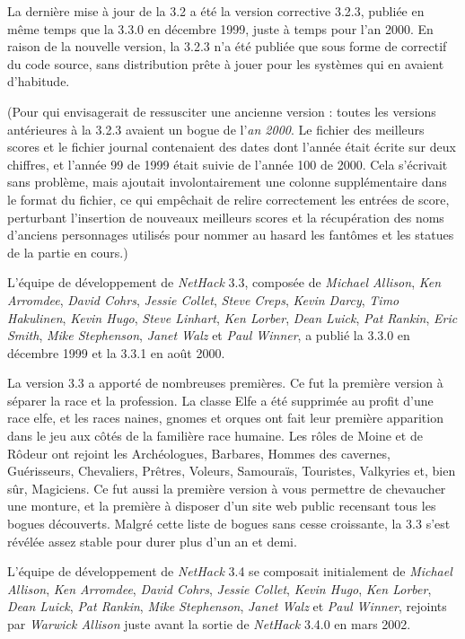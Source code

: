 \documentclass[titlepage]{article}
\begin{document}
\medskip
La dernière mise à jour de la 3.2 a été la version corrective 3.2.3, publiée
en même temps que la 3.3.0 en décembre 1999, juste à temps pour l'an 2000.
En raison de la nouvelle version, la 3.2.3 n'a été publiée que sous forme de correctif
du code source, sans distribution prête à jouer pour les systèmes qui en avaient d'habitude.

(Pour qui envisagerait de ressusciter une ancienne version : toutes les versions antérieures
à la 3.2.3 avaient un bogue de l'\textit{an 2000}.
Le fichier des meilleurs scores et le fichier journal contenaient
des dates dont l'année était écrite sur deux chiffres, et l'année 99 de 1999 était
suivie de l'année 100 de 2000.
Cela s'écrivait sans problème, mais
ajoutait involontairement une colonne supplémentaire dans le format du fichier, ce qui
empêchait de relire correctement les entrées de score, perturbant l'insertion
de nouveaux meilleurs scores et la récupération des noms d'anciens personnages utilisés
pour nommer au hasard les fantômes et les statues de la partie en cours.)

\medskip
L'équipe de développement de \textit{NetHack} 3.3, composée de \textit{Michael Allison}, \textit{Ken Arromdee},
\textit{David Cohrs}, \textit{Jessie Collet}, \textit{Steve Creps}, \textit{Kevin Darcy},
\textit{Timo Hakulinen}, \textit{Kevin Hugo}, \textit{Steve Linhart}, \textit{Ken Lorber},
\textit{Dean Luick}, \textit{Pat Rankin}, \textit{Eric Smith}, \textit{Mike Stephenson},
\textit{Janet Walz} et \textit{Paul Winner}, a publié la 3.3.0 en
décembre 1999 et la 3.3.1 en août 2000.

\medskip
La version 3.3 a apporté de nombreuses premières. Ce fut la première version à séparer
la race et la profession. La classe Elfe a été supprimée au profit d'une race elfe,
et les races naines, gnomes et orques ont fait leur première apparition dans
le jeu aux côtés de la familière race humaine.  Les rôles de Moine et de Rôdeur ont rejoint
les Archéologues, Barbares, Hommes des cavernes, Guérisseurs, Chevaliers, Prêtres, Voleurs, Samouraïs,
Touristes, Valkyries et, bien sûr, Magiciens.  Ce fut aussi la première version
à vous permettre de chevaucher une monture, et la première à disposer d'un site web
public recensant tous les bogues découverts.  Malgré
cette liste de bogues sans cesse croissante, la 3.3 s'est révélée assez stable pour durer
plus d'un an et demi.

\medskip
L'équipe de développement de \textit{NetHack} 3.4 se composait initialement de
\textit{Michael Allison}, \textit{Ken Arromdee},
\textit{David Cohrs}, \textit{Jessie Collet}, \textit{Kevin Hugo}, \textit{Ken Lorber},
\textit{Dean Luick}, \textit{Pat Rankin}, \textit{Mike Stephenson},
\textit{Janet Walz} et \textit{Paul Winner}, rejoints par \textit{ Warwick Allison}
juste avant la sortie de \textit{NetHack} 3.4.0 en mars 2002.
\end{document}
